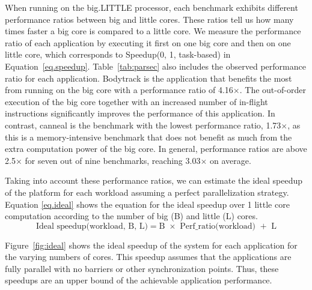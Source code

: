
When running on the big.LITTLE processor, each benchmark exhibits different performance ratios between big and little cores. These ratios tell us how many times faster a big core is compared to a little core. We measure the performance ratio of each application by executing it first on one big core and then on one little core, which corresponds to Speedup(0, 1, task-based) in Equation~\ref{eq.speedup}. 
Table~\ref{tab:parsec} also includes the observed performance ratio for each application. Bodytrack is the application that benefits the most from running on the big core with a performance ratio of 4.16$\times$. The out-of-order execution of the big core together with an increased number of in-flight instructions significantly improves the performance of this application. In contrast, canneal is the benchmark with the lowest performance ratio, 1.73$\times$, as this is a memory-intensive benchmark that does not benefit as much from the extra computation power of the big core. In general, performance ratios are above 2.5$\times$ for seven out of nine benchmarks, reaching 3.03$\times$ on average. 


Taking into account these performance ratios, we can estimate the ideal speedup of the platform for 
each workload assuming a perfect parallelization strategy. Equation \ref{eq.ideal} shows the 
equation for the ideal speedup over 1 little core computation according to the number of big (B) and 
little (L) cores.
\begingroup\makeatletter\def\f@size{8}\check@mathfonts
\begin{equation}
  \text{Ideal speedup(workload, B, L)} = \text{B $\times$ Perf\_ratio(workload) $+$ L}
\label{eq.ideal}
\end{equation}
\endgroup


Figure~\ref{fig:ideal} shows the ideal speedup of the system for each application for the varying 
numbers of cores. This speedup assumes that the applications are fully parallel with no barriers or 
other synchronization points. Thus, these speedups are an upper bound of the achievable application performance.
